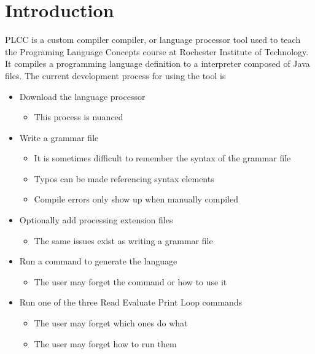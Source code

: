 \documentclass[conference, letterpaper]{IEEEtran}
\begin{document}
\section{Introduction}\label{sec:introduction}
PLCC\cite{plcc-paper} is a custom compiler compiler, or language processor tool used to teach the Programing Language Concepts course at Rochester Institute of Technology.
It compiles a programming language definition to a interpreter composed of Java files.
The current development process for using the tool is
\begin{itemize}
    \item Download the language processor
    \begin{itemize}
        \item This process is nuanced
    \end{itemize}

    \item Write a grammar file
    \begin{itemize}
        \item It is sometimes difficult to remember the syntax of the grammar file
        \item Typos can be made referencing syntax elements
        \item Compile errors only show up when manually compiled
    \end{itemize}

    \item Optionally add processing extension files
    \begin{itemize}
        \item The same issues exist as writing a grammar file
    \end{itemize}

    \item Run a command to generate the language
    \begin{itemize}
        \item The user may forget the command or how to use it
    \end{itemize}

    \item Run one of the three Read Evaluate Print Loop commands
    \begin{itemize}
        \item The user may forget which ones do what
        \item The user may forget how to run them
    \end{itemize}

\end{itemize}
\end{document}
